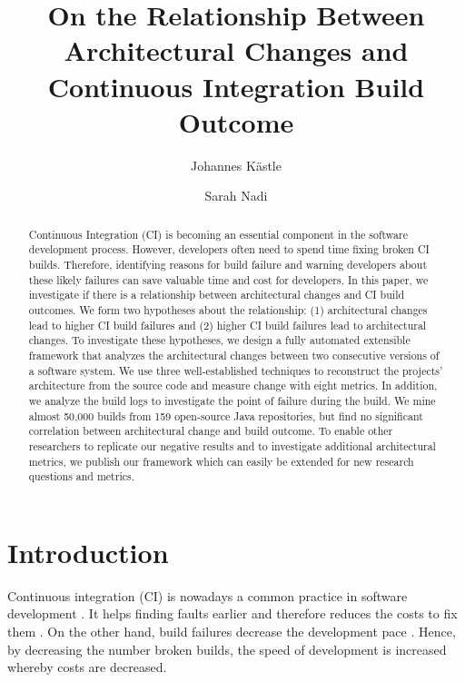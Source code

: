 \documentclass[sigconf, anonymous, review]{acmart}
\begin{document}
\title[Architectural Change vs CI Build Outcome]{On the Relationship Between Architectural Changes and Continuous Integration Build Outcome
}

\author{Johannes K{\"a}stle}

\author{Sarah Nadi}

\begin{abstract}
Continuous Integration (CI) is becoming an essential component in the software development process.
However, developers often need to spend time fixing broken CI builds.
Therefore, identifying reasons for build failure and warning developers about these likely failures can save valuable time and cost for developers.
In this paper, we investigate if there is a relationship between architectural changes and CI build outcomes.
We form two hypotheses about the relationship: (1) architectural changes lead to higher CI build failures and (2) higher CI build failures lead to architectural changes.
To investigate these hypotheses, we design a fully automated extensible framework that analyzes the architectural changes between two consecutive versions of a software system.
We use three well-established techniques to reconstruct the projects' architecture from the source code and measure change with eight metrics. 
In addition, we analyze the build logs to investigate the point of failure during the build. 
We mine almost 50,000 builds from 159 open-source Java repositories, but find no significant correlation between architectural change and build outcome. 
To enable other researchers to replicate our negative results and to investigate additional architectural metrics, we publish our framework which can easily be extended for new research questions and metrics.
\end{abstract}

\maketitle

\section{Introduction}

Continuous integration (CI) is nowadays a common practice in software development \cite{CI-Common}. It helps finding faults earlier and therefore reduces the costs to fix them \cite{NutzenCI}. On the other hand, build failures decrease the development pace \cite{Costs-BuildFailures}. Hence, by decreasing the number broken builds, the speed of development is increased whereby costs are decreased.
\end{document}
